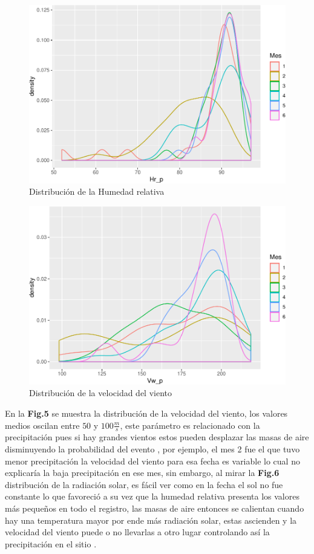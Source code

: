 \documentclass[conference,final,]{IEEEtran}
\makeatletter
\def\maxwidth{\ifdim\Gin@nat@width>\linewidth\linewidth
\else\Gin@nat@width\fi}
\let\Oldincludegraphics\includegraphics
\renewcommand{\includegraphics}[1]{\Oldincludegraphics[width=\maxwidth]{#1}}
\makeatother
\begin{document}
\begin{figure}
\centering
\includegraphics{Hidrology_files/figure-latex/unnamed-chunk-8-1.pdf}
\caption{Distribución de la Humedad relativa}
\end{figure}

\begin{figure}
\centering
\includegraphics{Hidrology_files/figure-latex/unnamed-chunk-11-1.pdf}
\caption{Distribución de la velocidad del viento}
\end{figure}

En la \textbf{Fig.5} se muestra la distribución de la velocidad del
viento, los valores medios oscilan entre \(50\) y \(100 \frac{m}{s}\),
este parámetro es relacionado con la precipitación pues si hay grandes
vientos estos pueden desplazar las masas de aire disminuyendo la
probabilidad del evento \cite{tobon}, por ejemplo, el mes 2 fue el que
tuvo menor precipitación la velocidad del viento para esa fecha es
variable lo cual no explicaría la baja precipitación en ese mes, sin
embargo, al mirar la \textbf{Fig.6} distribución de la radiación solar,
es fácil ver como en la fecha el sol no fue constante lo que favoreció a
su vez que la humedad relativa presenta los valores más pequeños en todo
el registro, las masas de aire entonces se calientan cuando hay una
temperatura mayor por ende más radiación solar, estas ascienden y la
velocidad del viento puede o no llevarlas a otro lugar controlando así
la precipitación en el sitio \cite{tobon}.
\end{document}
